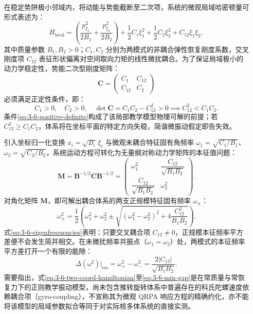 在稳定势阱极小邻域内，将动能与势能截断至二次项，系统的微观局域哈密顿量可形式表述为：
\begin{equation}\label{eq:3-6-two-coord-hamiltonian}
H_{\mathrm{local}} = \left(\frac{p_{\xi_1}^2}{2B_1} + \frac{p_{\xi_2}^2}{2B_2}\right) + \frac{1}{2} C_1 \xi_1^2 + \frac{1}{2} C_2 \xi_2^2 + C_{12} \xi_1 \xi_2 ,
\end{equation}
其中质量参数 $B_1, B_2 > 0$；$C_1, C_2$ 分别为两模式的非耦合弹性恢复刚度系数，交叉刚度项 $C_{12}$ 表征形状偏离对空间取向力矩的线性微扰耦合。为了保证局域极小的动力学稳定性，势能二次型刚度矩阵：
\begin{equation}\label{eq:3-6-stiffness-matrix}
\mathbf{C} = \begin{pmatrix} C_1 & C_{12} \\ C_{12} & C_2 \end{pmatrix}
\end{equation}
必须满足正定性条件，即：
\begin{equation}\label{eq:3-6-positive-definite}
C_1 > 0, \quad C_2 > 0, \quad \det\mathbf{C} = C_1 C_2 - C_{12}^2 > 0 \implies C_{12}^2 < C_1 C_2 .
\end{equation}
条件\eqref{eq:3-6-positive-definite}构成了该局部教学模型物理可解的前提；若 $C_{12}^2 \ge C_1 C_2$，体系将在坐标平面的特定方向失稳，简谐微振动假定即告失效。

引入坐标归一化变换 $x_i = \sqrt{B_i}\,\xi_i$ 与微观未耦合特征固有角频率 $\omega_1 = \sqrt{C_1/B_1}$、$\omega_2 = \sqrt{C_2/B_2}$，系统运动方程可转化为无量纲对称动力学矩阵的本征值问题：
\begin{equation}\label{eq:3-6-dynamic-matrix}
\mathbf{M} = \mathbf{B}^{-1/2} \mathbf{C} \mathbf{B}^{-1/2} = \begin{pmatrix} \omega_1^2 & \dfrac{C_{12}}{\sqrt{B_1 B_2}} \\ \dfrac{C_{12}}{\sqrt{B_1 B_2}} & \omega_2^2 \end{pmatrix} .
\end{equation}
对角化矩阵 $\mathbf{M}$，即可解出耦合体系的两支正规模特征固有频率 $\omega_\pm$：
\begin{equation}\label{eq:3-6-eigenfrequencies}
\omega_\pm^2 = \frac{1}{2}\left(\omega_1^2 + \omega_2^2 \pm \sqrt{(\omega_1^2 - \omega_2^2)^2 + 4 \frac{C_{12}^2}{B_1 B_2}}\right) .
\end{equation}
式\eqref{eq:3-6-eigenfrequencies}表明：只要交叉耦合项 $C_{12} \neq 0$，正规模本征频率平方差便不会发生简并相交。在未微扰频率共振点（$\omega_1 = \omega_2$）处，两模式的本征频率平方差打开一个有限的能隙：
\begin{equation}\label{eq:3-6-min-gap}
\Delta(\omega^2)\big|_{\mathrm{res}} = \omega_+^2 - \omega_-^2 = \frac{2 |C_{12}|}{\sqrt{B_1 B_2}} .
\end{equation}
需要指出，式\eqref{eq:3-6-two-coord-hamiltonian}至\eqref{eq:3-6-min-gap}是在常质量与常恢复力下的正则教学振动模型，尚未包含推转旋转体系中普遍存在的科氏陀螺速度依赖耦合项（gyro-coupling），不宣称其为微观 QRPA 响应方程的精确约化，亦不能将该模型的局域参数拟合等同于对实际核多体系统的直接实测。

